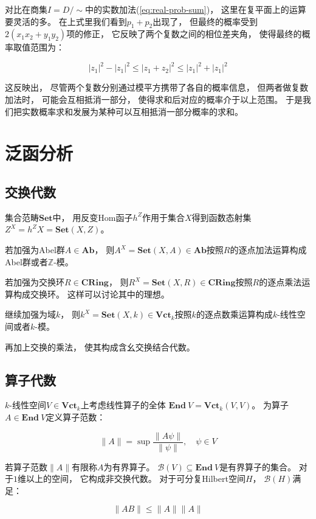 \documentclass[10pt, openany]{book}
\begin{document}
对比在商集$I = D/\sim$中的实数加法(\ref{eq:real-prob-sum})，
这里在复平面上的运算要灵活的多。
在上式里我们看到$p_1 + p_2$出现了，
但最终的概率受到$2(x_1x_2 + y_1y_2)$项的修正，
它反映了两个复数之间的相位差夹角，
使得最终的概率取值范围为：

$$
|z_1|^2 - |z_1|^2 \leq |z_1 + z_2|^2 \leq |z_1|^2 + |z_1|^2
$$

这反映出，
尽管两个复数分别通过模平方携带了各自的概率信息，
但两者做复数加法时，
可能会互相抵消一部分，
使得求和后对应的概率介于以上范围。
于是我们把实数概率求和发展为某种可以互相抵消一部分概率的求和。

\chapter{泛函分析}


\section{交换代数}

集合范畴$\textbf{Set}$中，
用反变Hom函子$h^Z$作用于集合$X$得到函数态射集
$Z^X = h^Z X = \textbf{Set}(X,Z)$。

若加强为Abel群$A\in\textbf{Ab}$，
则$A^X = \textbf{Set}(X,A)\in\textbf{Ab}$按照$R$的逐点加法运算构成Abel群或者$\mathbb Z$-模。

若加强为交换环$R\in\textbf{CRing}$，
则$R^X = \textbf{Set}(X,R)\in\textbf{CRing}$按照$R$的逐点乘法运算构成交换环。
这样可以讨论其中的理想。

继续加强为域$k$，
则$k^X = \textbf{Set}(X,k)\in\textbf{Vct}_k$按照$k$的逐点数乘运算构成$k$-线性空间或者$k$-模。

再加上交换的乘法，
使其构成含幺交换结合代数。

\section{算子代数}

$k$-线性空间$V\in\textbf{Vct}_k$上考虑线性算子的全体
$\textbf{End} \ V = \textbf{Vct}_k(V,V)$。
为算子$A\in\textbf{End} \ V$定义算子范数：

$$
\| A \| = \sup \frac{\| A\psi \|}{\| \psi \|},\quad 
\psi \in V
$$

若算子范数$\| A \|$有限称$A$为有界算子。
$\mathcal B(V) \subseteq \textbf{End} \ V$是有界算子的集合。
对于$1$维以上的空间，
它构成非交换代数。
对于可分复Hilbert空间$H$，
$\mathcal B(H)$满足：

$$
\| A B \| \leq \| A \| \| A \|
$$
\end{document}
